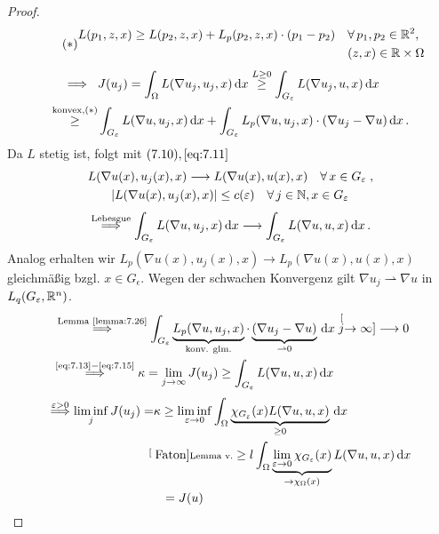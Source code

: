 \begin{proof}
\begin{align*}
\tag{$\ast$}
\begin{aligned}
 L(p_1, z, x) \geq L(p_2, z, x) + L_p (p_2, z,x) \cdot (p_1-p_2) \quad & \forall \, p_1,p_2 \in \mathbb{R}^2,\\
 & (z,x)\in\mathbb{R}\times \Omega
 \end{aligned}
 \end{align*}
 \begin{align}
 \label{eq:7.13}
\Longrightarrow \ \ \, & J(u_j)  = \int_\Omega L(\nabla u_j, u_j, x) \,\mathrm{d} x \stackrel{L\geq 0}\geq \int_{G_\varepsilon} L(\nabla u_j, u, x) \,\mathrm{d} x \notag\\
\stackrel{\scriptsize\text{konvex}, (\ast)}\geq &\int_{G_\varepsilon} L(\nabla u, u_j, x) \,\mathrm{d} x + \int_{G_\varepsilon} L_p(\nabla u, u_j, x) \cdot (\nabla u_j-\nabla u) \,\mathrm{d} x \, .
\end{align}
Da $L$ stetig ist, folgt mit $(7.10), \eqref{eq:7.11}$
\begin{align*}
L(\nabla& u(x), u_j(x), x) \longrightarrow L(\nabla u(x),u(x),x) \quad \forall \, x \in G_\varepsilon \; , \\
&\lvert L(\nabla u(x), u_j(x), x)\rvert \leq c(\varepsilon) \quad \forall \, j \in \mathbb{N}, x \in G_\varepsilon
\end{align*}
\begin{align}
\label{eq:7.14}
\stackrel{\scriptsize\text{Lebesgue}}{\Longrightarrow} \int_{G_\varepsilon} L(\nabla u, u_j, x)\,\mathrm{d} x \longrightarrow \int_{G_\varepsilon} L(\nabla u, u , x) \,\mathrm{d} x \, .
\end{align}
Analog erhalten wir $L_p (\nabla u(x), u_j(x), x) \rightarrow L_p(\nabla u(x),u(x),x)$ gleichmäßig bzgl. $x \in G_\epsilon$. Wegen der schwachen Konvergenz gilt $\nabla u_j \rightharpoonup \nabla u$ in $L_q(G_\varepsilon, \mathbb{R}^n)$.
\begin{align}
\label{eq:7.15}
&\, \stackrel{\scriptsize\text{Lemma }\ref{lemma:7.26}}{\Longrightarrow}  \int_{G_\varepsilon} \underbrace{L_p(\nabla u, u_j, x)}_{\text{konv. glm.}} \cdot \underbrace{(\nabla u_j - \nabla u)}_{\rightharpoonup 0} \,\mathrm{d} x \stackrel[j \rightarrow \infty]{}\longrightarrow 0 \\
&\stackrel{\scriptsize\eqref{eq:7.13}-\eqref{eq:7.15}} {\Longrightarrow} \kappa = \lim_{j\rightarrow \infty} J(u_j) \geq \int_{G_\varepsilon} L(\nabla u, u, x) \,\mathrm{d} x \notag
\end{align}
\begin{align*}
\stackrel{\varepsilon >0}{\Longrightarrow} \liminf_{j} J(u_j) =& \kappa \geq \liminf_{\varepsilon \rightarrow 0} \int_\Omega \underbrace{\chi_{G_\varepsilon} (x) L(\nabla u, u, x)}_{\geq 0} \,\mathrm{d} x \\
&\! \! \! \!\stackrel[\scriptsize\text{Faton}]{\scriptsize\text{Lemma v.}}\geq l \int_\Omega \underbrace{\lim_{\varepsilon\rightarrow 0} \chi_{G_\varepsilon} (x)}_{\rightarrow \chi_\Omega (x)} L(\nabla u, u, x) \,\mathrm{d} x \\
&\ \ =J(u)\qedhere
\end{align*}
\end{proof}


